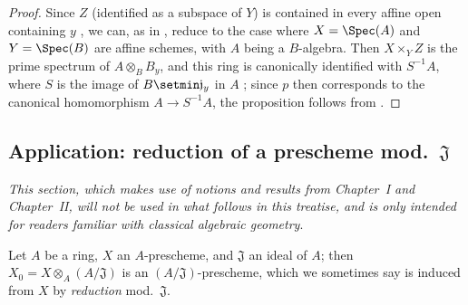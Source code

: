 \begin{proof}
Since $Z$ (identified as a subspace of $Y$) is contained in every affine open containing $y$ , we can, as in , reduce to the case where $X=\Spec(A)$ and $Y=\Spec(B)$ are affine schemes, with $A$ being a $B$-algebra.
Then $X\times_Y Z$ is the prime spectrum of $A\otimes_B B_y$, and this ring is canonically identified with $S^{-1}A$, where $S$ is the image of $B\setmin\mathfrak{j}_y$ in $A$ ; since $p$ then corresponds to the canonical homomorphism $A\to S^{-1}A$, the proposition follows from .
\end{proof}

\subsection{Application: reduction of a prescheme mod.~$\mathfrak{J}$}
\label{subsection:I.3.7}

\emph{This section, which makes use of notions and results from Chapter~I and Chapter~II, will not be used in what follows in this treatise, and is only intended for readers familiar with classical algebraic geometry}.

\begin{env}[3.7.1]
\label{I.3.7.1}
Let $A$ be a ring, $X$ an $A$-prescheme, and $\mathfrak{J}$ an ideal of $A$; then $X_0=X\otimes_A(A/\mathfrak{J})$ is an $(A/\mathfrak{J})$-prescheme, which we sometimes say is induced from $X$ by \emph{reduction} mod.~$\mathfrak{J}$.
\end{env}


